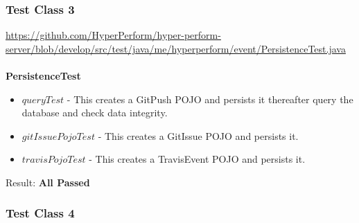 \documentclass[11pt,a4paper]{article}
\begin{document}
\subsubsection{Test Class 3}
\url{https://github.com/HyperPerform/hyper-perform-server/blob/develop/src/test/java/me/hyperperform/event/PersistenceTest.java}\\\\
\textbf{PersistenceTest}
\begin{itemize}
	\item $queryTest$ - This creates a GitPush POJO and persists it thereafter query the database and check data integrity.
	\item $gitIssuePojoTest$ - This creates a GitIssue POJO and persists it.
	\item $travisPojoTest$ - This creates a TravisEvent POJO and persists it.\\

\end{itemize}
 Result: \textbf{All Passed}


\subsubsection{Test Class 4}
\end{document}
